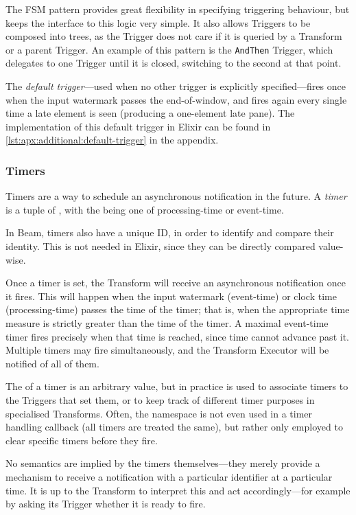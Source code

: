 The FSM pattern provides great flexibility in specifying triggering behaviour, but keeps the interface to this logic very simple.
It also allows Triggers to be composed into trees, as the Trigger does not care if it is queried by a Transform or a parent Trigger.
An example of this pattern is the \verb|AndThen| Trigger, which delegates to one Trigger until it is closed, switching to the second at that point.

The \emph{default trigger}---used when no other trigger is explicitly specified---fires once when the input watermark passes the end-of-window, and fires again every single time a late element is seen (producing a one-element late pane).
The implementation of this default trigger in Elixir can be found in \cref{lst:apx:additional:default-trigger} in the appendix.

\subsubsection{Timers}

Timers are a way to schedule an asynchronous notification in the future.
A \emph{timer} is a tuple of \footnotemark, with the  being one of processing-time or event-time.

\footnotetext
{
In Beam, timers also have a unique ID, in order to identify and compare their identity. This is not needed in Elixir, since they can be directly compared value-wise.
}

Once a timer is set, the Transform will receive an asynchronous notification once it fires.
This will happen when the input watermark (event-time) or clock time (processing-time) passes the time of the timer; that is, when the appropriate time measure is strictly greater than the time of the timer.
A maximal event-time timer fires precisely when that time is reached, since time cannot advance past it.
Multiple timers may fire simultaneously, and the Transform Executor will be notified of all of them.

The  of a timer is an arbitrary value, but in practice is used to associate timers to the Triggers that set them, or to keep track of different timer purposes in specialised Transforms.
Often, the namespace is not even used in a timer handling callback (all timers are treated the same), but rather only employed to clear specific timers before they fire.

No semantics are implied by the timers themselves---they merely provide a mechanism to receive a notification with a particular identifier at a particular time.
It is up to the Transform to interpret this and act accordingly---for example by asking its Trigger whether it is ready to fire.

